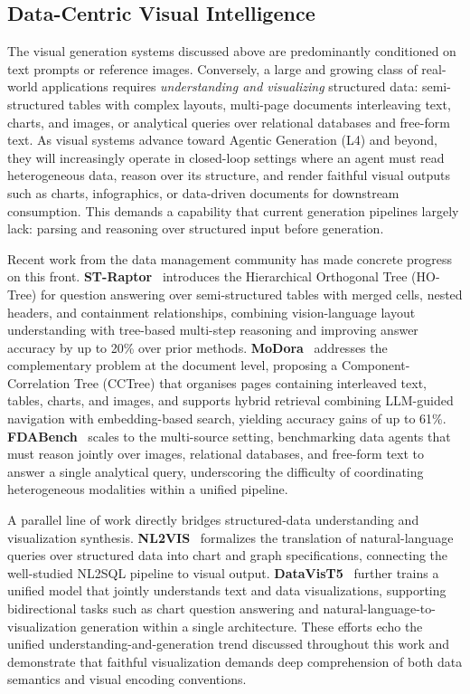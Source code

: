 \subsection{Data-Centric Visual Intelligence}
\label{subsec:data_centric}

The visual generation systems discussed above are predominantly conditioned on text prompts or reference images. Conversely, a large and growing class of real-world applications requires \emph{understanding and visualizing} structured data: semi-structured tables with complex layouts, multi-page documents interleaving text, charts, and images, or analytical queries over relational databases and free-form text. As visual systems advance toward Agentic Generation (L4) and beyond, they will increasingly operate in closed-loop settings where an agent must read heterogeneous data, reason over its structure, and render faithful visual outputs such as charts, infographics, or data-driven documents for downstream consumption. This demands a capability that current generation pipelines largely lack: parsing and reasoning over structured input before generation.

Recent work from the data management community has made concrete progress on this front. \textbf{ST-Raptor}~\citep{STRaptor} introduces the Hierarchical Orthogonal Tree (HO-Tree) for question answering over semi-structured tables with merged cells, nested headers, and containment relationships, combining vision-language layout understanding with tree-based multi-step reasoning and improving answer accuracy by up to 20\% over prior methods. \textbf{MoDora}~\citep{MoDora} addresses the complementary problem at the document level, proposing a Component-Correlation Tree (CCTree) that organises pages containing interleaved text, tables, charts, and images, and supports hybrid retrieval combining LLM-guided navigation with embedding-based search, yielding accuracy gains of up to 61\%. \textbf{FDABench}~\citep{FDABench} scales to the multi-source setting, benchmarking data agents that must reason jointly over images, relational databases, and free-form text to answer a single analytical query, underscoring the difficulty of coordinating heterogeneous modalities within a unified pipeline.

A parallel line of work directly bridges structured-data understanding and visualization synthesis. \textbf{NL2VIS}~\citep{NL2VIS} formalizes the translation of natural-language queries over structured data into chart and graph specifications, connecting the well-studied NL2SQL pipeline to visual output. \textbf{DataVisT5}~\citep{DataVisT5} further trains a unified model that jointly understands text and data visualizations, supporting bidirectional tasks such as chart question answering and natural-language-to-visualization generation within a single architecture. These efforts echo the unified understanding-and-generation trend discussed throughout this work and demonstrate that faithful visualization demands deep comprehension of both data semantics and visual encoding conventions.

